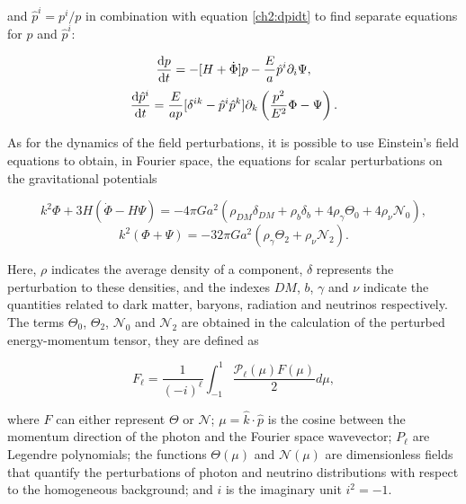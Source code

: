 \documentclass[openany,a4paper,12pt,oneside]{book}
\begin{document}
\begin{spacing}{1.5}
\noindent and $\hat{p}^i=p^i/p$ in combination with equation \eqref{ch2:dpidt} to find separate equations for $p$ and $\hat{p}^i$:

\begin{equation}\label{ch2:dpdt}
    \dv{p}{t}=-[H+\dot{\Phi}]p-\frac{E}{a}\hat{p}^i\partial_i\Psi,
\end{equation}
\begin{equation}\label{ch2:dp_hati_dt}
    \dv{\hat{p}^i}{t}=\frac{E}{ap}[\delta^{ik}-\hat{p}^i\hat{p}^k]\partial_k\left(\frac{p^2}{E^2}\Phi-\Psi\right).
\end{equation}

As for the dynamics of the field perturbations, it is possible to use Einstein's field equations to obtain, in Fourier space, the equations for scalar perturbations on the gravitational potentials \cite{dodelson2020modern}

\begin{equation}\label{ch2:first_dynamic_equation}
    k^2\Phi+3H(\dot{\Phi}-H\Psi)=-4\pi Ga^2(\rho_{DM}\delta_{DM}+\rho_b\delta_b+4\rho_\gamma \Theta_0+4\rho_\nu \mathcal{N}_0),
\end{equation}
\begin{equation}\label{ch2:second_dynamic_equation}
    k^2(\Phi+\Psi)=-32\pi Ga^2(\rho_\gamma \Theta_2+\rho_\nu \mathcal{N}_2).
\end{equation}

Here, $\rho$ indicates the average density of a component, $\delta$ represents the perturbation to these densities, and the indexes $DM$, $b$, $\gamma$ and $\nu$ indicate the quantities related to dark matter, baryons, radiation and neutrinos respectively. The terms $\Theta_0$, $\Theta_2$, $\mathcal{N}_0$ and $\mathcal{N}_2$ are obtained in the calculation of the perturbed energy-momentum tensor, they are defined as

\begin{equation}\label{ch2:Fl}
    F_\ell=\frac{1}{(-i)^\ell}\int_{-1}^1 \frac{\mathcal{P}_\ell(\mu)F(\mu)}{2}d\mu,
\end{equation}

\noindent where $F$ can either represent $\Theta$ or $\mathcal{N}$; $\mu=\hat{k}\cdot \hat{p}$ is the cosine between the momentum direction of the photon and the Fourier space wavevector; $P_\ell$ are Legendre polynomials; the functions $\Theta(\mu)$ and $\mathcal{N}(\mu)$ are dimensionless fields that quantify the perturbations of photon and neutrino distributions with respect to the homogeneous background; and $i$ is the imaginary unit $i^2=-1$. 


\end{spacing}
\end{document}
